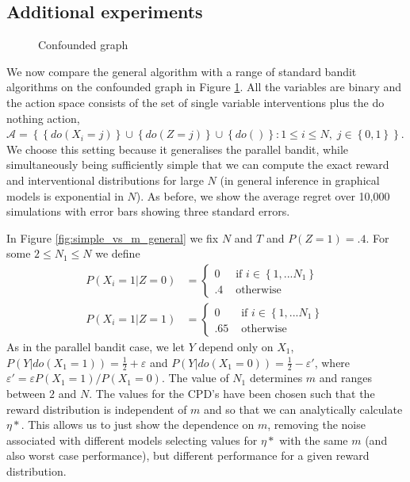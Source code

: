 \documentclass[11pt,a4paper,oneside]{book}
\newcommand{\calA}{\mathcal A}
\newcommand{\set}[1]{\left\{#1\right\}}
\newcommand{\eq}[1]{\begin{align*}#1\end{align*}}
\let\epsilon\varepsilon
\begin{document}
\subsection*{Additional experiments} 
\begin{figure}[H]
	\centering    
        \caption{Confounded graph}
        \label{fig:parallel_confounded} 
\end{figure}


We now compare the general algorithm with a range of standard bandit algorithms on the confounded graph in Figure \ref{fig:parallel_confounded}. All the variables are binary and the action space consists of the set of single variable interventions plus the do nothing action, $\calA = \set{\set{do(X_i = j)} \cup \set{do(Z = j)} \cup \set{do()}: 1\leq i \leq N,\; j \in \set{0,1}}$. We choose this setting because it generalises the parallel bandit, while simultaneously being sufficiently simple that we can compute the exact reward and interventional distributions for large $N$ (in general inference in graphical models is exponential in $N$). As before, we show the average regret over 10,000 simulations with error bars showing three standard errors. 

In Figure \ref{fig:simple_vs_m_general} we fix $N$ and $T$ and $P(Z=1) = .4$. For some $2 \leq N_1 \leq N$ we define 
\eq{
P(X_i = 1|Z = 0) &= \begin{cases} 0 & \text{ if } i \in \set{1,...N_1} \\ .4 & \text{ otherwise } \end{cases}\\
P(X_i = 1|Z = 1) &= \begin{cases} 0 & \text{ if } i \in \set{1,...N_1} \\ .65 & \text{ otherwise } \end{cases}
}
As in the parallel bandit case, we let $Y$ depend only on $X_1$, $P(Y|do(X_1=1)) = \frac{1}{2} + \epsilon$ and $P(Y|do(X_1=0)) = \frac{1}{2}-\epsilon'$, where $\epsilon' = \epsilon P(X_1=1) / P(X_1=0)$. The value of $N_1$ determines $m$ and ranges between $2$ and $N$. The values for the CPD's have been chosen such that the reward distribution is independent of $m$ and so that we can analytically calculate $\eta*$. This allows us to just show the dependence on $m$, removing the noise associated with different models selecting values for $\eta*$ with the same $m$ (and also worst case performance), but different performance for a given reward distribution. 
\end{document}
